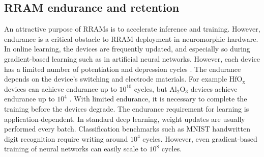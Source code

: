 \documentclass[english]{article}
\renewcommand{\cite}{\citep}
\begin{document}
\subsection{RRAM endurance and retention}
An attractive purpose of RRAMs is to accelerate inference and training.
However, endurance is a critical obstacle to RRAM deployment in neuromorphic hardware. 
In online learning, the devices are frequently updated, and especially so during gradient-based learning such as in artificial neural networks.
However, each device has a limited number of potentiation and depression cycles \cite{zhao2018characterizing,chen2011physical}. 
The endurance depends on the device's switching and electrode materials. For example $\mathrm{HfO_x}$ devices can achieve endurance up to $10^{10}$ cycles, but $\mathrm{Al_2O_3}$ devices achieve endurance up to $10^4$ \cite{nail2016understanding}.  
With limited endurance, it is necessary to complete the training before the devices degrade.
The endurance requirement for learning is application-dependent. 
In standard deep learning, weight updates are usually performed every batch. 
Classification benchmarks such as MNIST handwritten digit recognition require writing around $10^4$ cycles.
However, even gradient-based training of neural networks can easily scale to $10^8$ cycles. 
 
\end{document}
